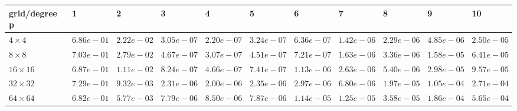 \begin{tabular}{lllllllllll}
\hline
 grid/degree p   & 1          & 2          & 3          & 4          & 5          & 6          & 7          & 8          & 9          & 10         \\
\hline
 $4 \times 4$    & $6.86e-01$ & $2.22e-02$ & $3.05e-07$ & $2.20e-07$ & $3.24e-07$ & $6.36e-07$ & $1.42e-06$ & $2.29e-06$ & $4.85e-06$ & $2.50e-05$ \\
 $8 \times 8$    & $7.03e-01$ & $2.79e-02$ & $4.67e-07$ & $3.07e-07$ & $4.51e-07$ & $7.21e-07$ & $1.63e-06$ & $3.36e-06$ & $1.58e-05$ & $6.41e-05$ \\
 $16 \times 16$  & $6.87e-01$ & $1.11e-02$ & $8.24e-07$ & $4.66e-07$ & $7.41e-07$ & $1.13e-06$ & $2.63e-06$ & $5.40e-06$ & $2.98e-05$ & $9.57e-05$ \\
 $32 \times 32$  & $7.29e-01$ & $9.32e-03$ & $2.31e-06$ & $2.00e-06$ & $2.35e-06$ & $2.97e-06$ & $6.80e-06$ & $1.97e-05$ & $1.05e-04$ & $2.71e-04$ \\
 $64 \times 64$  & $6.82e-01$ & $5.77e-03$ & $7.79e-06$ & $8.50e-06$ & $7.87e-06$ & $1.14e-05$ & $1.25e-05$ & $3.58e-05$ & $1.86e-04$ & $5.65e-04$ \\
\hline
\end{tabular}
